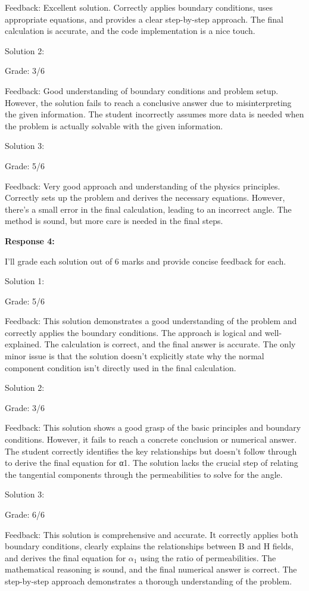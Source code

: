\documentclass[a4paper,11pt]{article}
\begin{document}
Feedback: Excellent solution. Correctly applies boundary conditions, uses appropriate equations, and provides a clear step-by-step approach. The final calculation is accurate, and the code implementation is a nice touch.

Solution 2:

Grade: 3/6

Feedback: Good understanding of boundary conditions and problem setup. However, the solution fails to reach a conclusive answer due to misinterpreting the given information. The student incorrectly assumes more data is needed when the problem is actually solvable with the given information.

Solution 3:

Grade: 5/6

Feedback: Very good approach and understanding of the physics principles. Correctly sets up the problem and derives the necessary equations. However, there's a small error in the final calculation, leading to an incorrect angle. The method is sound, but more care is needed in the final steps.

\bigskip
\textbf{Response 4:}

I'll grade each solution out of 6 marks and provide concise feedback for each.

Solution 1:

Grade: 5/6

Feedback: This solution demonstrates a good understanding of the problem and correctly applies the boundary conditions. The approach is logical and well-explained. The calculation is correct, and the final answer is accurate. The only minor issue is that the solution doesn't explicitly state why the normal component condition isn't directly used in the final calculation.

Solution 2:

Grade: 3/6

Feedback: This solution shows a good grasp of the basic principles and boundary conditions. However, it fails to reach a concrete conclusion or numerical answer. The student correctly identifies the key relationships but doesn't follow through to derive the final equation for α1. The solution lacks the crucial step of relating the tangential components through the permeabilities to solve for the angle.

Solution 3:

Grade: 6/6

Feedback: This solution is comprehensive and accurate. It correctly applies both boundary conditions, clearly explains the relationships between B and H fields, and derives the final equation for \(\alpha_1\) using the ratio of permeabilities. The mathematical reasoning is sound, and the final numerical answer is correct. The step-by-step approach demonstrates a thorough understanding of the problem.
\end{document}
